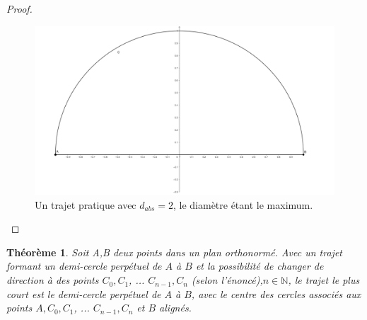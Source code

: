 \documentclass[a4paper]{amsart}
\newtheorem{theorem}{Théorème}[section]
\theoremstyle{definition}
\theoremstyle{remark}
\numberwithin{equation}{section}
\begin{document}
\begin{proof}
  \begin{figure}[H]
    \centering
    \includegraphics[scale=0.1]{images/ab_circle.png}
    \caption{Un trajet pratique avec $d_{abs}=2$, le diamètre étant le maximum.}
  \end{figure}

\end{proof}

\begin{theorem}
  Soit A,B deux points dans un plan orthonormé. Avec un trajet formant un demi-cercle perpétuel de $A$ à $B$ et la possibilité de changer de direction à des points $C_0, C_1$, ... $C_{n-1}, C_{n}$ (selon l'énoncé),$n\in\mathbb{N}$, le trajet le plus court
  est le demi-cercle perpétuel de $A$ à $B$, avec le centre des cercles associés aux points $A,C_0, C_1$, ... $C_{n-1}, C_{n}$ et $B$ alignés.
\end{theorem}
\end{document}
